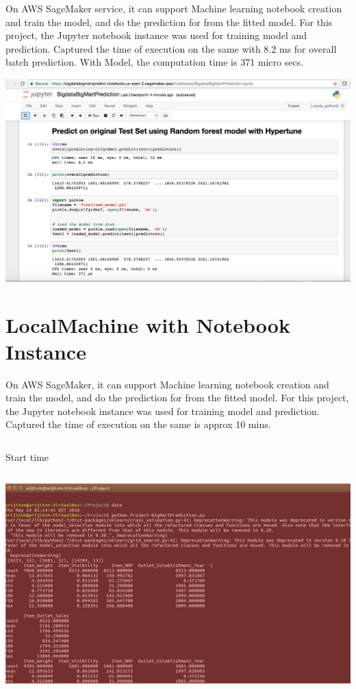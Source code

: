 On AWS SageMaker service, it can support Machine learning notebook creation 
and train the model, and do the prediction for from the fitted model. For this 
project, the Jupyter notebook instance was used for training model and 
prediction. Captured the time of execution on the same with 8.2 ms for overall 
batch prediction. With Model, the computation time is 371 micro secs.


\includegraphics[width=\columnwidth]{Images/AWSnotebookscreenshot.png}


\section{LocalMachine with Notebook Instance}

On AWS SageMaker, it can support Machine learning notebook creation and 
train the model, and do the prediction for from the fitted model. For this 
project, the Jupyter notebook instance was used for training model and 
prediction. Captured the time of execution on the same is approx 10 mins.
\begin{verbatim}

\end{verbatim}
Start time
\begin{verbatim}

\end{verbatim}

\includegraphics[width=\columnwidth]{Images/Starttimelocal.png}
\begin{verbatim}

\end{verbatim}

